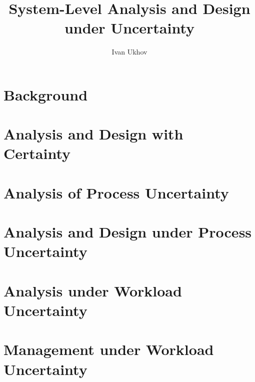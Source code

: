 \documentclass{thesis}
\title{
  System-Level Analysis and Design\\[0.2em]
  under Uncertainty
}
\author{Ivan Ukhov}
\begin{document}
\chapter{\introductiontitle}
\glsresetall
\newcommand{\inputsection}[1]{}


\chapter{Background}
\glsresetall
\renewcommand{\inputsection}[1]{}


\chapter{Analysis and Design with Certainty}
\glsresetall
\renewcommand{\inputsection}[1]{}


\chapter{Analysis of Process Uncertainty}
\glsresetall
\renewcommand{\inputsection}[1]{}


\chapter{Analysis and Design under Process Uncertainty}
\glsresetall
\renewcommand{\inputsection}[1]{}


\chapter{Analysis under Workload Uncertainty}
\glsresetall
\renewcommand{\inputsection}[1]{}


\chapter{Management under Workload Uncertainty}
\glsresetall
\renewcommand{\inputsection}[1]{}

\end{document}
